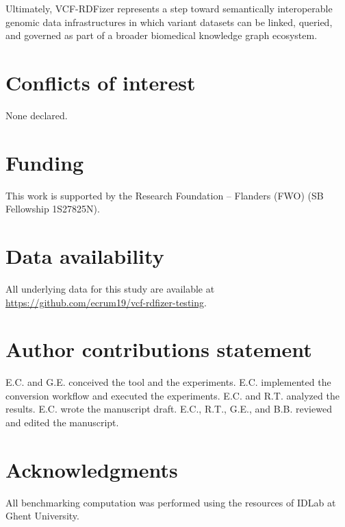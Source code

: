 \documentclass[unnumsec,webpdf,contemporary,large]{oup-authoring-template}
\begin{document}
Ultimately, VCF-RDFizer represents a step toward semantically interoperable genomic data infrastructures in which variant datasets can be linked, queried, and governed as part of a broader biomedical knowledge graph ecosystem.


\section{Conflicts of interest}
None declared.

\section{Funding}
This work is supported by the Research Foundation – Flanders (FWO) (SB Fellowship 1S27825N).

\section{Data availability}
All underlying data for this study are available at \url{https://github.com/ecrum19/vcf-rdfizer-testing}.

\section{Author contributions statement}
E.C. and G.E. conceived the tool and the experiments.
E.C. implemented the conversion workflow and executed the experiments.
E.C. and R.T. analyzed the results.
E.C. wrote the manuscript draft.
E.C., R.T., G.E., and B.B. reviewed and edited the manuscript.

\section{Acknowledgments}
All benchmarking computation was performed using the resources of IDLab at Ghent University.





%
%
\end{document}
